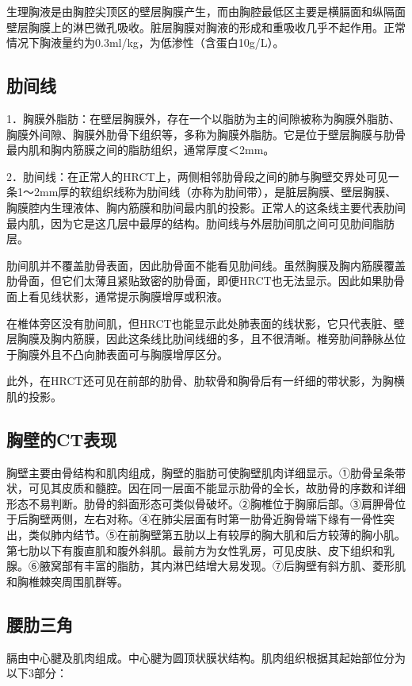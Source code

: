 生理胸液是由胸腔尖顶区的壁层胸膜产生，而由胸腔最低区主要是横膈面和纵隔面壁层胸膜上的淋巴微孔吸收。脏层胸膜对胸液的形成和重吸收几乎不起作用。正常情况下胸液量约为0.3ml/kg，为低渗性（含蛋白10g/L）。

\subsection{肋间线}

1．胸膜外脂肪：在壁层胸膜外，存在一个以脂肪为主的间隙被称为胸膜外脂肪、胸膜外间隙、胸膜外肋骨下组织等，多称为胸膜外脂肪。它是位于壁层胸膜与肋骨最内肌和胸内筋膜之间的脂肪组织，通常厚度＜2mm。

2．肋间线：在正常人的HRCT上，两侧相邻肋骨段之间的肺与胸壁交界处可见一条1～2mm厚的软组织线称为肋间线（亦称为肋间带），是脏层胸膜、壁层胸膜、胸膜腔内生理液体、胸内筋膜和肋间最内肌的投影。正常人的这条线主要代表肋间最内肌，因为它是这几层中最厚的结构。肋间线与外层肋间肌之间可见肋间脂肪层。

肋间肌并不覆盖肋骨表面，因此肋骨面不能看见肋间线。虽然胸膜及胸内筋膜覆盖肋骨面，但它们太薄且紧贴致密的肋骨面，即便HRCT也无法显示。因此如果肋骨面上看见线状影，通常提示胸膜增厚或积液。

在椎体旁区没有肋间肌，但HRCT也能显示此处肺表面的线状影，它只代表脏、壁层胸膜及胸内筋膜，因此这条线比肋间线细的多，且不很清晰。椎旁肋间静脉丛位于胸膜外且不凸向肺表面可与胸膜增厚区分。

此外，在HRCT还可见在前部的肋骨、肋软骨和胸骨后有一纤细的带状影，为胸横肌的投影。

\subsection{胸壁的CT表现}

胸壁主要由骨结构和肌肉组成，胸壁的脂肪可使胸壁肌肉详细显示。①肋骨呈条带状，可见其皮质和髓腔。因在同一层面不能显示肋骨的全长，故肋骨的序数和详细形态不易判断。肋骨的斜面形态可类似骨破坏。②胸椎位于胸廓后部。③肩胛骨位于后胸壁两侧，左右对称。④在肺尖层面有时第一肋骨近胸骨端下缘有一骨性突出，类似肺内结节。⑤在前胸壁第五肋以上有较厚的胸大肌和后方较薄的胸小肌。第七肋以下有腹直肌和腹外斜肌。最前方为女性乳房，可见皮肤、皮下组织和乳腺。⑥腋窝部有丰富的脂肪，其内淋巴结增大易发现。⑦后胸壁有斜方肌、菱形肌和胸椎棘突周围肌群等。

\subsection{腰肋三角}

膈由中心腱及肌肉组成。中心腱为圆顶状膜状结构。肌肉组织根据其起始部位分为以下3部分：

